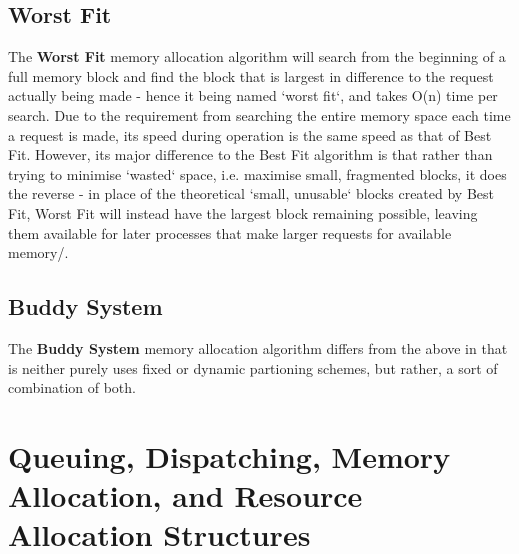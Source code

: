 \documentclass[11pt]{article}
\begin{document}
\subsection{Worst Fit}
The \textbf{Worst Fit} memory allocation algorithm will search from the beginning of a full memory block and find the block that is largest in difference to the request actually being made - hence it being named `worst fit`, and takes O(n) time per search. Due to the requirement from searching the entire memory space each time a request is made, its speed during operation is the same speed as that of Best Fit. \iffalse REFERENCE D. Samanta. `Classic Data Structures` 2004. p. 76\fi However, its major difference to the Best Fit algorithm is that rather than trying to minimise `wasted` space, i.e. maximise small, fragmented blocks, it does the reverse - in place of the theoretical `small, unusable` blocks created by Best Fit, Worst Fit will instead have the largest block remaining possible, leaving them available for later processes that make larger requests for available memory/.

\subsection{Buddy System}
The \textbf{Buddy System} memory allocation algorithm differs from the above in that is neither purely uses fixed or dynamic partioning schemes, but rather, a sort of combination of both.   

\iffalse (UNIX uses a version of this) Firefox uses jemalloc - an implementation of Buddy, first appeared in FreeBSD
http://stackoverflow.com/questions/1624726/how-does-jemalloc-work-what-are-the-benefits\fi

\iffalse (Justification of choice - identifies memory allocation algorithm used in code and clearly justifies choice in context of assignment - 2 marks) \fi

\section{Queuing, Dispatching, Memory Allocation, and Resource Allocation Structures}

\iffalse
(Provides thorough description of ALL dispatcher structures that are relevant to host dispatcher implementation - 5 marks + 1 bonus)

b. Describe and discuss the structures used by the dispatcher for queuing,
dispatching and allocating memory and other resources.
\fi
\end{document}

